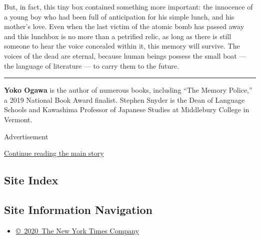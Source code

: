 But, in fact, this tiny box contained something more important: the
innocence of a young boy who had been full of anticipation for his
simple lunch, and his mother's love. Even when the last victim of the
atomic bomb has passed away and this lunchbox is no more than a
petrified relic, as long as there is still someone to hear the voice
concealed within it, this memory will survive. The voices of the dead
are eternal, because human beings possess the small boat --- the
language of literature --- to carry them to the future.

\begin{center}\rule{0.5\linewidth}{\linethickness}\end{center}

\textbf{Yoko Ogawa} is the author of numerous books, including ``The
Memory Police,'' a 2019 National Book Award finalist. Stephen Snyder is
the Dean of Language Schools and Kawashima Professor of Japanese Studies
at Middlebury College in Vermont.

Advertisement

\protect\hyperlink{after-bottom}{Continue reading the main story}

\hypertarget{site-index}{%
\subsection{Site Index}\label{site-index}}

\hypertarget{site-information-navigation}{%
\subsection{Site Information
Navigation}\label{site-information-navigation}}

\begin{itemize}
\tightlist
\item
  \href{https://help.nytimes.com/hc/en-us/articles/115014792127-Copyright-notice}{©~2020~The
  New York Times Company}
\end{itemize}

